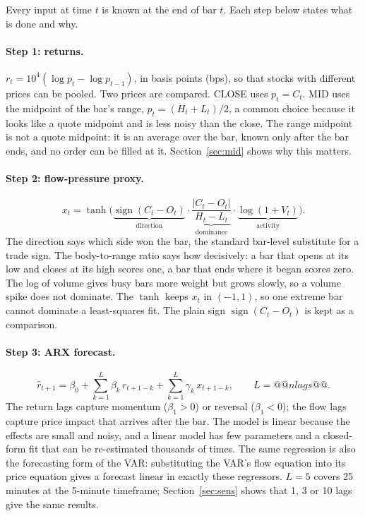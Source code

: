 \documentclass[11pt,a4paper]{article}
\begin{document}
Every input at time $t$ is known at the end of bar $t$. Each step below states what is done and why.

\paragraph{Step 1: returns.} $r_t = 10^4(\log p_t - \log p_{t-1})$, in basis points (bps), so that stocks
with different prices can be pooled. Two prices are compared. CLOSE uses $p_t=C_t$. MID uses the midpoint
of the bar's range, $p_t=(H_t+L_t)/2$, a common choice because it looks like a quote midpoint and is less
noisy than the close. The range midpoint is not a quote midpoint: it is an average over the bar, known only after the bar
ends, and no order can be filled at it. Section~\ref{sec:mid} shows why this matters.

\paragraph{Step 2: flow-pressure proxy.}
\begin{equation}
x_t = \tanh\!\Big(\underbrace{\operatorname{sign}(C_t-O_t)}_{\text{direction}}\cdot
\underbrace{\frac{|C_t-O_t|}{H_t-L_t}}_{\text{dominance}}\cdot\underbrace{\log(1+V_t)}_{\text{activity}}\Big).
\label{eq:x}
\end{equation}
The direction says which side won the bar, the standard bar-level substitute for a trade sign. The
body-to-range ratio says how decisively: a bar that opens at its low and closes at its high scores one,
a bar that ends where it began scores zero. The log of volume gives busy bars more weight but grows slowly,
so a volume spike does not dominate. The $\tanh$ keeps $x_t$ in $(-1,1)$, so one extreme bar cannot
dominate a least-squares fit. The plain sign $\operatorname{sign}(C_t-O_t)$ is kept as a comparison.

\paragraph{Step 3: ARX forecast.}
\begin{equation}
\hat r_{t+1} = \beta_0 + \sum_{k=1}^{L}\beta_k\, r_{t+1-k} + \sum_{k=1}^{L}\gamma_k\, x_{t+1-k},\qquad L=@@nlags@@.
\label{eq:arx}
\end{equation}
The return lags capture momentum ($\beta_1>0$) or reversal ($\beta_1<0$); the flow lags capture price
impact that arrives after the bar. The model is linear because the effects are small and noisy, and a
linear model has few parameters and a closed-form fit that can be re-estimated thousands of times. The same regression is also the forecasting form of the \citet{hasbrouck1991} VAR: substituting the VAR's flow
equation into its price equation gives a forecast linear in exactly these regressors. $L=5$ covers 25
minutes at the 5-minute timeframe; Section~\ref{sec:sens} shows that 1, 3 or 10 lags give the same
results.
\end{document}
